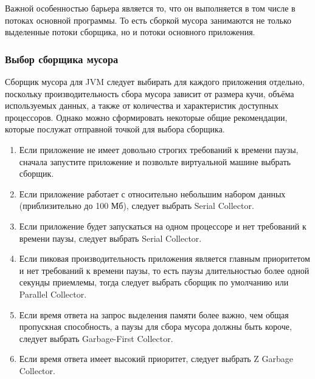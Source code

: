 Важной особенностью барьера является то, что он выполняется в том числе в потоках основной программы. То есть сборкой мусора занимаются не только выделенные потоки сборщика, но и потоки основного приложения.


\subsubsection{Выбор сборщика мусора}

Сборщик мусора для JVM следует выбирать для каждого приложения отдельно, поскольку производительность сбора мусора зависит от размера кучи, объёма используемых данных, а также от количества и характеристик доступных процессоров. Однако можно сформировать некоторые общие рекомендации, которые послужат отправной точкой для выбора сборщика. \cite{java_11_available_collectors}

\begin{enumerate}[label*=\arabic*.]
	\item Если приложение не имеет довольно строгих требований к времени паузы, сначала запустите приложение и позвольте виртуальной машине выбрать сборщик.
	\item Если приложение работает с относительно небольшим набором данных (приблизительно до 100 Мб), следует выбрать Serial Collector.
	\item Если приложение будет запускаться на одном процессоре и нет требований к времени паузы, следует выбрать Serial Collector.
	\item Если пиковая производительность приложения является главным приоритетом и нет требований к времени паузы, то есть паузы длительностью более одной секунды приемлемы, тогда следует выбрать сборщик по умолчанию или Parallel Collector.
	\item Если время ответа на запрос выделения памяти более важно, чем общая пропускная способность, а паузы для сбора мусора должны быть короче, следует выбрать Garbage-First Collector.
	\item Если время ответа имеет высокий приоритет, следует выбрать Z Garbage Collector.
\end{enumerate}



